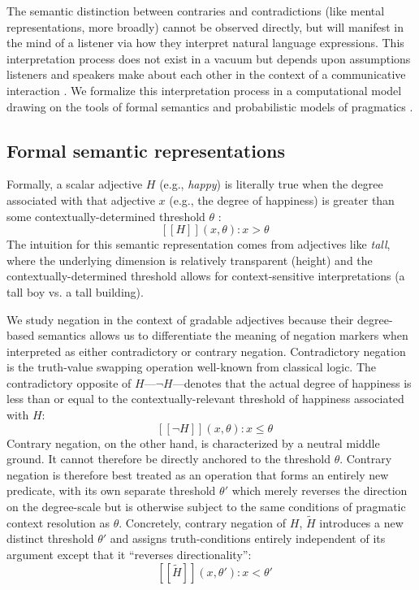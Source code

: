 \documentclass[floatsintext,doc]{apa6}
\begin{document}
The semantic distinction between contraries and contradictions (like mental representations, more broadly) cannot be observed directly, but will manifest in the mind of a listener via how they interpret natural language expressions. 
This interpretation process does not exist in a vacuum but depends upon assumptions listeners and speakers make about each other in the context of a communicative interaction \cite{Grice1975}.
We formalize this interpretation process in a computational model drawing on the tools of formal semantics and probabilistic models of pragmatics \cite{Franke2015a, Goodman2016:RSA}. 

\subsection{Formal semantic representations}

Formally, a scalar adjective $H$ (e.g., \emph{happy}) is literally true when the degree associated with that adjective \(x\) (e.g., the degree of happiness) is greater than some contextually-determined threshold \(\theta\) \cite{Kennedy2007}:
$$
\mbox{ $[\![H]\!]$}(x, \theta): x > \theta
$$
The intuition for this semantic representation comes from adjectives like \emph{tall}, where the underlying dimension is relatively transparent (height) and the contextually-determined threshold allows for context-sensitive interpretations (a tall boy vs. a tall building).

We study negation in the context of gradable adjectives because their degree-based semantics allows us to differentiate the meaning of negation markers when interpreted as either contradictory or contrary negation.
Contradictory negation is the truth-value swapping operation well-known from classical logic.
The contradictory opposite of $H$---$\neg H$---denotes that the actual degree of happiness is less than or equal to the contextually-relevant threshold of happiness associated with $H$: 
$$ 
\mbox{ $[\![\neg H]\!]$}(x, \theta): x \leq \theta
$$
Contrary negation, on the other hand, is characterized by a neutral middle ground.
It cannot therefore be directly anchored to the threshold $\theta$.
Contrary negation is therefore best treated as an operation that forms an entirely new predicate, with its own separate threshold $\theta'$ which merely reverses the direction on the degree-scale but is otherwise subject to the same conditions of pragmatic context resolution as $\theta$.
Concretely, contrary negation of $H$, $\tilde{H}$ introduces a new distinct threshold \(\theta'\) and assigns truth-conditions entirely independent of its argument except that it ``reverses directionality'': 
$$
\mbox{ $[\![ \tilde{H} ]\!]$}(x, \theta'): x < \theta'
$$
\end{document}
